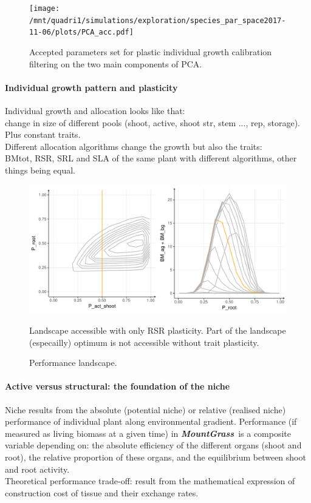 \documentclass[review]{elsarticle}
\newcommand{\model}{\textbf{\textit{MountGrass}}~}
\begin{document}
\begin{figure}
\texttt{[image: /mnt/quadri1/simulations/exploration/species\_par\_space2017-11-06/plots/PCA\_acc.pdf]}
\caption{Accepted parameters set for plastic individual growth calibration filtering  on the two main components of PCA.}
\end{figure}

\paragraph{Individual growth pattern and plasticity}

Individual growth and allocation looks like that:\\
change in size of different pools (shoot, active, shoot str, stem ..., rep, storage). Plus constant traits.\\

Different allocation algorithms change the growth but also the traits:\\
BMtot, RSR, SRL and SLA of the same plant with different algorithms, other things being equal.

\begin{figure}
\includegraphics[width = \textwidth]{./Figures/Perf_landscape.pdf}
\caption{Performance landscape.}
Landscape accessible with only RSR plasticity. Part of the landscape (especailly) optimum is not accessible without trait plasticity.
\end{figure}

\paragraph{Active versus structural: the foundation of the niche}

Niche results from the absolute (potential niche) or relative (realised niche) performance of individual plant along environmental gradient. Performance (if measured as living biomass at a given time) in \model is a composite variable depending on: the absolute efficiency of the different organs (shoot and root), the relative proportion of these organs, and the equilibrium between shoot and root activity.\\
Theoretical performance trade-off: result from the mathematical expression of construction cost of tissue and their exchange rates.\\
\end{document}

